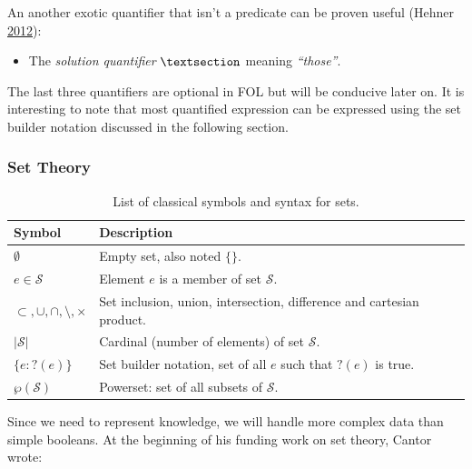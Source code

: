 \documentclass[11pt,a4paper,twoside,openright,titlepage,numbers=noenddot,headinclude,cleardoublepage=empty,openany]{scrreprt}
\theoremstyle{plain}
\theoremstyle{definition}
\theoremstyle{remark}
\providecommand{\tightlist}{%
  \setlength{\itemsep}{0pt}\setlength{\parskip}{0pt}}
\renewcommand{\cal}{\mathcal}
\begin{document}
An another exotic quantifier that isn't a predicate can be proven useful
(Hehner \protect\hyperlink{ref-hehner_practical_2012}{2012}):

\begin{itemize}
\tightlist
\item
  The \emph{solution quantifier} \(\textsection\) meaning
  \emph{``those''}.
\end{itemize}

The last three quantifiers are optional in FOL but will be conducive
later on. It is interesting to note that most quantified expression can
be expressed using the set builder notation discussed in the following
section.

\hypertarget{set-theory}{%
\subsubsection{Set Theory}\label{set-theory}}

\hypertarget{tbl:set}{}
\begin{table}\footnotesize
\centering

\caption{\label{tbl:set}List of classical symbols and syntax for sets.}

\begin{tabular}{@{}ll@{}}
\toprule

\textbf{Symbol} & \textbf{Description} \\\midrule

\(\emptyset\) & Empty set, also noted \(\{\}\). \\
\(e \in \cal{S}\) & Element \(e\) is a member of set \(\cal{S}\). \\
\(\subset, \cup, \cap, \setminus, \times\) & Set inclusion, union,
intersection, difference and cartesian product. \\
\(|\cal{S}|\) & Cardinal (number of elements) of set \(\cal{S}\). \\
\(\{e : ?(e)\}\) & Set builder notation, set of all \(e\) such that
\(?(e)\) is true. \\
\(\wp(\cal{S})\) & Powerset: set of all subsets of \(\cal{S}\). \\

\bottomrule
\end{tabular}

\end{table}

Since we need to represent knowledge, we will handle more complex data
than simple booleans. At the beginning of his funding work on set
theory, Cantor wrote:
\end{document}
